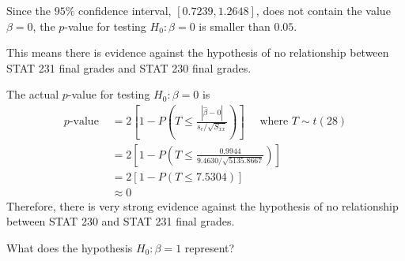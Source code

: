 \begin{exbox}
    \begin{example}[Testing $ H_0:\beta=0 $ for STAT 230/231 Final Grades]
        Since the $ 95\% $ confidence interval, $ \left[ 0.7239,1.2648 \right] $,
        does not contain the value $ \beta=0 $, the $ p $-value for testing
        $ H_0:\beta=0 $ is smaller than $ 0.05 $.

        This means there is evidence against the hypothesis of no relationship
        between STAT 231 final grades and STAT 230 final grades.
    \end{example}
\end{exbox}

\begin{exbox}
    \begin{example}
        The actual $ p $-value for testing $ H_0:\beta=0 $ is
        \[\begin{aligned}
                p\text{-value }
                 & =2\left[1-P\left(T \leq \frac{|\hat{\beta}-0|}{s_{e} / \sqrt{S_{x x}}}\right)\right]
                \quad \text { where }T \sim t(28)                                                       \\
                 & =2\left[1-P\left(T \leq \frac{0.9944}{9.4630 / \sqrt{5135.8667}}\right)\right]       \\
                 & =2[1-P(T \leq 7.5304)]                                                               \\
                 & \approx 0
            \end{aligned}\]
        Therefore, there is very strong evidence against the hypothesis of no relationship
        between STAT 230 and STAT 231 final grades.
    \end{example}
\end{exbox}

What does the hypothesis $ H_0:\beta=1 $ represent?

